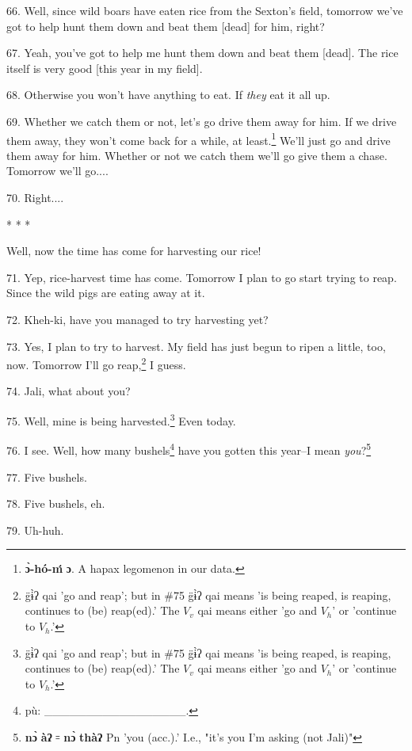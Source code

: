 \setcounter{footnote}{0}


66. Well, since wild boars have eaten rice from the Sexton's field, tomorrow we've
got to help hunt them down and beat them [dead] for him, right?

67. Yeah, you've got to help me hunt them down and beat them [dead]. The rice itself
is very good [this year in my field].

68. Otherwise you won't have anything to eat. If \textit{they} eat it all up.

69. Whether we catch them or not, let's go drive them away for him. If we drive
them away, they won't come back for a while, at least.\footnote{\textbf{ɔ̀-hó-ḿ} \textbf{ɔ}. A hapax legomenon in our data.} We'll just go and drive
them away for him. Whether or not we catch them we'll go give them a chase. Tomorrow
we'll go....

70. Right....

\begin{center}
* * *
\end{center}

Well, now the time has come for harvesting our rice!

71. Yep, rice-harvest time has come. Tomorrow I plan to go start trying to reap.
Since the wild pigs are eating away at it.

72. Kheh-ki, have you managed to try harvesting yet?

73. Yes, I plan to try to harvest. My field has just begun to ripen a little, too,
now. Tomorrow I'll go reap,\footnote{g̈ɨ̀ʔ qai 'go and reap'; but in \#75 g̈ɨ̀ʔ qai means 'is being reaped, is reaping, continues to (be) reap(ed).' The $V_v$ qai means either 'go and $V_h$' or 'continue to $V_h$.'} I guess.

74. Jali, what about you?

75. Well, mine is being harvested.\footnote{g̈ɨ̀ʔ qai 'go and reap'; but in \#75 g̈ɨ̀ʔ qai means 'is being reaped, is reaping, continues to (be) reap(ed).' The $V_v$ qai means either 'go and $V_h$' or 'continue to $V_h$.'} Even today.

76. I see. Well, how many bushels\footnote{pù: \_\_\_\_\_\_\_\_\_\_\_\_\_\_\_\_\_.} have you gotten this year--I mean \emph{you}?\footnote{\textbf{nɔ̀} \textbf{àʔ} ꞊ \textbf{nɔ̀} \textbf{thàʔ} Pn 'you (acc.).' I.e., "it's you I'm asking (not Jali)"}

77. Five bushels.

78. Five bushels, eh.

79. Uh-huh.

